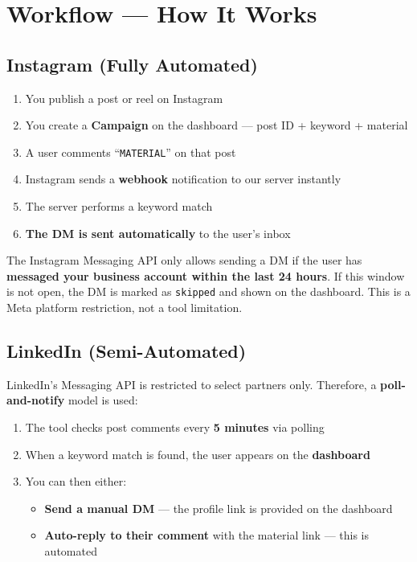 \documentclass[12pt,a4paper]{article}
\begin{document}
\section{Workflow --- How It Works}

\subsection{Instagram (Fully Automated)}

\begin{tcolorbox}[colback=blue!2, colframe=pri!60, boxrule=0.3pt]
\begin{enumerate}[leftmargin=1.5em, itemsep=0.4em]
    \item You publish a post or reel on Instagram
    \item You create a \textbf{Campaign} on the dashboard --- post ID + keyword + material
    \item A user comments ``\texttt{MATERIAL}'' on that post
    \item Instagram sends a \textbf{webhook} notification to our server instantly
    \item The server performs a keyword match
    \item \textbf{The DM is sent automatically} to the user's inbox
\end{enumerate}
\end{tcolorbox}

\begin{tcolorbox}[colback=red!3, colframe=red!50, boxrule=0.4pt, title={\small Instagram Limitation}]
The Instagram Messaging API only allows sending a DM if the user has \textbf{messaged your business account within the last 24 hours}. If this window is not open, the DM is marked as \texttt{skipped} and shown on the dashboard. This is a Meta platform restriction, not a tool limitation.
\end{tcolorbox}

\subsection{LinkedIn (Semi-Automated)}

LinkedIn's Messaging API is restricted to select partners only. Therefore, a \textbf{poll-and-notify} model is used:

\begin{enumerate}[leftmargin=1.5em, itemsep=0.3em]
    \item The tool checks post comments every \textbf{5 minutes} via polling
    \item When a keyword match is found, the user appears on the \textbf{dashboard}
    \item You can then either:
    \begin{itemize}[itemsep=0.2em]
        \item \textbf{Send a manual DM} --- the profile link is provided on the dashboard
        \item \textbf{Auto-reply to their comment} with the material link --- this is automated
    \end{itemize}
\end{enumerate}
\end{document}
